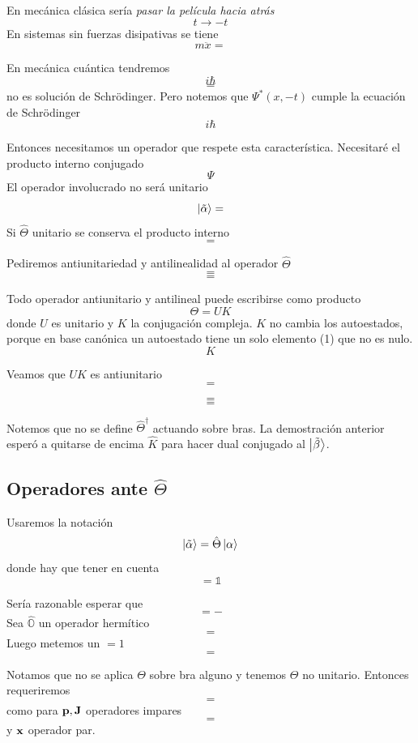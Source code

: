 \documentclass[10pt,oneside]{CBFT_book}
\begin{document}
En mecánica clásica sería {\it pasar la película hacia atrás}
\[
	t \longrightarrow -t
\]
En sistemas sin fuerzas disipativas se tiene 
\[
	m \ddot{x} =
\]

En mecánica cuántica tendremos 
\[
	i \hbar 
\]
\[
	=
\]
no es solución de Schrödinger. 
Pero notemos que $\Psi^*(x,-t)$ cumple la ecuación de Schrödinger
\[
	i\hbar
\]

Entonces necesitamos un operador que respete esta característica. Necesitaré el producto interno conjugado 
\[
	\Psi
\]
El operador involucrado no será unitario 
\[
	\Ket{\tilde{\alpha}} = 
\]
Si $\hat{\Theta}$ unitario se conserva el producto interno 
\[
	=
\]

Pediremos antiunitariedad y antilinealidad al operador $\hat{\Theta}$
\[
	=
\]
\[
	=
\]

Todo operador antiunitario y antilineal puede escribirse como producto 
\[
	\Theta = U K
\]
donde $U$ es unitario y $K$ la conjugación compleja. $K$ no cambia los autoestados, porque en base canónica 
un autoestado tiene un solo elemento (1) que no es nulo.
\[
	K
\]

Veamos que $UK$ es antiunitario 
\[
	=
\]

\[
	=
\]
\[
	=
\]

Notemos que no se define $\hat{\Theta}^\dagger$ actuando sobre bras. La demostración anterior esperó a 
quitarse de encima $\hat{K}$ para hacer dual conjugado al $\Ket{\tilde{\beta}}$.

\subsection{Operadores ante $\hat{\Theta}$}

Usaremos la notación 
\[
	\Ket{\tilde{\alpha}} = \hat{\Theta} \Ket{\alpha}
\]
donde hay que tener en cuenta 
\[
	= \mathbb{1}
\]

Sería razonable esperar que 
\[
	= -
\]
Sea $\hat{\mathbb{O}}$ un operador hermítico 
\[
	=
\]
Luego metemos un $=1$
\[
	=
\]

Notamos que no se aplica $\Theta$ sobre bra alguno y tenemos $\Theta$ no unitario. Entonces requeriremos 
\[
	=
\]
como para $\vb{p},\vb{J}$ operadores impares 
\[
	=
\]
y $\vb{x}$ operador par.
\end{document}
